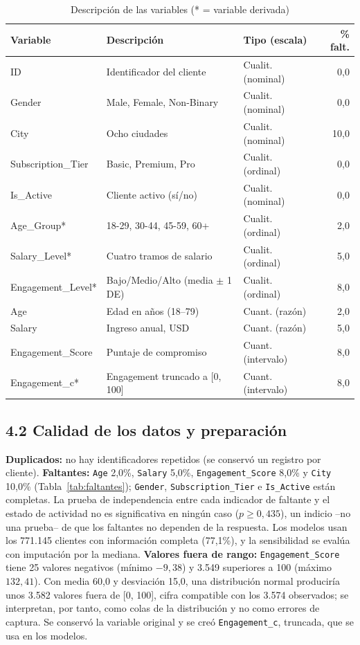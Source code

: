 \documentclass[a4,11pt]{aleph-notas}
\begin{document}
\begin{table}[!htb]\centering\small\linespread{1}\selectfont
\caption{Descripción de las variables (* = variable derivada)}\label{tab:variables}
\begin{tabular}{llp{3.4cm}r}
\toprule
Variable & Descripción & Tipo (escala) & \% falt. \\
\midrule
ID & Identificador del cliente & Cualit. (nominal) & 0,0 \\
Gender & Male, Female, Non-Binary & Cualit. (nominal) & 0,0 \\
City & Ocho ciudades & Cualit. (nominal) & 10,0 \\
Subscription\_Tier & Basic, Premium, Pro & Cualit. (ordinal) & 0,0 \\
Is\_Active & Cliente activo (sí/no) & Cualit. (nominal) & 0,0 \\
Age\_Group* & 18-29, 30-44, 45-59, 60+ & Cualit. (ordinal) & 2,0 \\
Salary\_Level* & Cuatro tramos de salario & Cualit. (ordinal) & 5,0 \\
Engagement\_Level* & Bajo/Medio/Alto (media $\pm$ 1 DE) & Cualit. (ordinal) & 8,0 \\
Age & Edad en años (18--79) & Cuant. (razón) & 2,0 \\
Salary & Ingreso anual, USD & Cuant. (razón) & 5,0 \\
Engagement\_Score & Puntaje de compromiso & Cuant. (intervalo) & 8,0 \\
Engagement\_c* & Engagement truncado a [0, 100] & Cuant. (intervalo) & 8,0 \\
\bottomrule
\end{tabular}
\par{}
\end{table}

\subsection*{4.2 Calidad de los datos y preparación}
\textbf{Duplicados:} no hay identificadores repetidos (se conservó un registro por cliente). \textbf{Faltantes:} \texttt{Age} 2,0\%, \texttt{Salary} 5,0\%, \texttt{Engagement\_Score} 8,0\% y \texttt{City} 10,0\% (Tabla~\ref{tab:faltantes}); \texttt{Gender}, \texttt{Subscription\_Tier} e \texttt{Is\_Active} están completas. La prueba de independencia entre cada indicador de faltante y el estado de actividad no es significativa en ningún caso ($p\geq 0{,}435$), un indicio --no una prueba-- de que los faltantes no dependen de la respuesta. Los modelos usan los 771.145 clientes con información completa (77,1\%), y la sensibilidad se evalúa con imputación por la mediana. \textbf{Valores fuera de rango:} \texttt{Engagement\_Score} tiene 25 valores negativos (mínimo $-9{,}38$) y 3.549 superiores a 100 (máximo $132{,}41$). Con media 60,0 y desviación 15,0, una distribución normal produciría unos 3.582 valores fuera de [0, 100], cifra compatible con los 3.574 observados; se interpretan, por tanto, como colas de la distribución y no como errores de captura. Se conservó la variable original y se creó \texttt{Engagement\_c}, truncada, que se usa en los modelos.
\end{document}
